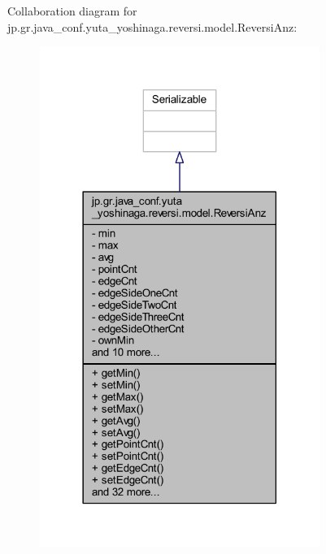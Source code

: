 Collaboration diagram for jp.\+gr.\+java\+\_\+conf.\+yuta\+\_\+yoshinaga.\+reversi.\+model.\+Reversi\+Anz\+:
\nopagebreak
\begin{figure}[H]
\begin{center}
\leavevmode
\includegraphics[width=258pt]{classjp_1_1gr_1_1java__conf_1_1yuta__yoshinaga_1_1reversi_1_1model_1_1_reversi_anz__coll__graph}
\end{center}
\end{figure}
